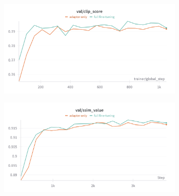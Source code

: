 \begin{figure}[htbp]
  \centering
  \begin{subfigure}[b]{0.48\textwidth}
  \centering
    \includegraphics[width=\textwidth]{images/experiments/adapter_vs_full/clip_score.png}
    \label{fig:exp_adap_vs_full_clip}
  \end{subfigure}
  \hfill
  \begin{subfigure}[b]{0.48\textwidth}
    \centering
    \includegraphics[width=\textwidth]{images/experiments/adapter_vs_full/ssim.png}
    \label{fig:exp_adap_vs_full_ssim}
  \end{subfigure}
  

\end{figure}
